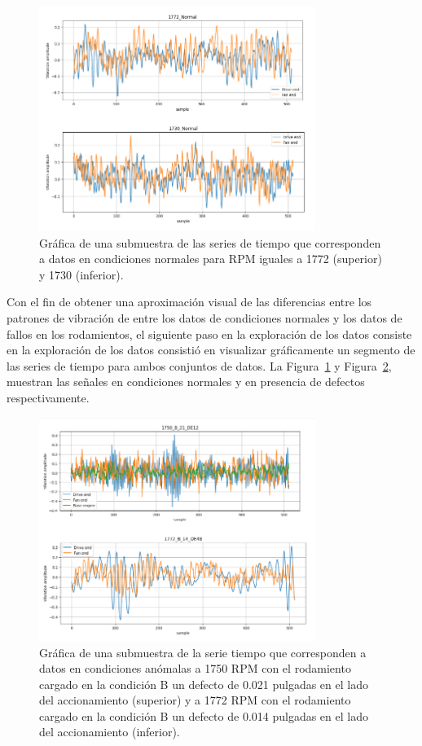 \documentclass[11pt,a4paper,spanish]{book}
\numberwithin{equation}{chapter}
\numberwithin{figure}{chapter}
\begin{document}
\begin{figure}[h]
    \centering
    \includegraphics[width=0.8\textwidth]{media/dataset/normal-series.png}
    \caption{Gráfica de una submuestra de las series de tiempo que corresponden a datos 
    en condiciones normales para RPM iguales a 1772 (superior) y 1730 (inferior). }
    \label{fig:figNormalSeries}
\end{figure}


Con el fin de obtener una aproximación visual de las diferencias entre los patrones de 
vibración de entre los datos de condiciones normales y los datos de fallos en los 
rodamientos, el siguiente paso en la exploración de los datos consiste en la exploración 
de los datos consistió en visualizar gráficamente un segmento de las series de tiempo 
para ambos conjuntos de datos. La Figura~\ref{fig:figNormalSeries} y 
Figura~\ref{fig:figAnomalySeries}, muestran las señales en condiciones normales y en 
presencia de defectos respectivamente. 


\begin{figure}[h]
    \centering
    \includegraphics[width=0.8\textwidth]{media/dataset/anomaly-series.png}
    \caption{Gráfica de una submuestra de la serie tiempo que corresponden a datos en 
    condiciones anómalas a 1750 RPM con el rodamiento cargado en la condición B un 
    defecto de 0.021 pulgadas en el lado del accionamiento (superior) y a 1772 RPM con 
    el rodamiento cargado en la condición B un defecto de 0.014 pulgadas en el lado del 
    accionamiento (inferior). }
    \label{fig:figAnomalySeries}
\end{figure}
\end{document}
